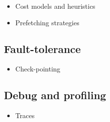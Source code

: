\documentclass[DIV=calc, paper=a4, fontsize=11pt, twocolumn]{scrartcl}	 %
\begin{document}
\begin{itemize}
   \item Cost models and heuristics
   \item Prefetching strategies
\end{itemize}

\subsection{Fault-tolerance}

\begin{itemize}
   \item Check-pointing
\end{itemize}

\subsection{Debug and profiling}

\begin{itemize}
   \item Traces
\end{itemize}
\end{document}
